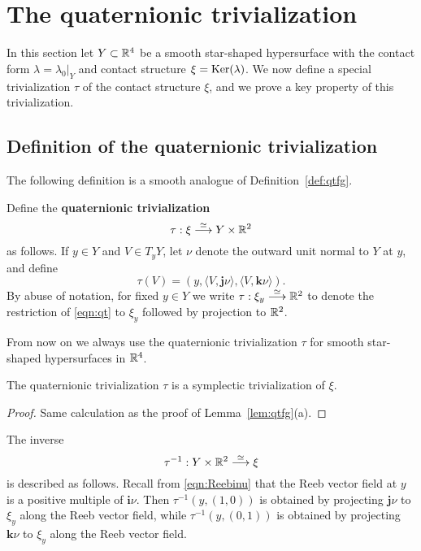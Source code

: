 \section{The quaternionic trivialization}
\label{sec:quaternionic}

In this section let $Y\subset{\mathbb R}^4$ be a smooth star-shaped hypersurface with the contact form $\lambda = \lambda_0|_Y$ and contact structure $\xi=\operatorname{Ker}(\lambda)$. We now define a special trivialization $\tau$ of the contact structure $\xi$, and we prove a key property of this trivialization.

\subsection{Definition of the quaternionic trivialization}

The following definition is a smooth analogue of Definition~\ref{def:qtfg}.

\begin{definition}
Define the {\bf quaternionic trivialization}
\begin{equation}
\label{eqn:qt}
\tau: \xi \stackrel{\simeq}{\longrightarrow} Y\times {\mathbb R}^2
\end{equation}
as follows. If $y\in Y$ and $V\in T_yY$, let $\nu$ denote the outward unit normal to $Y$ at $y$, and define
\[
\tau(V) = \left(y,\langle V,{\mathbf j}\nu\rangle, \langle V,{\mathbf k}\nu\rangle\right).
\]
By abuse of notation, for fixed $y\in Y$ we write $\tau:\xi_y\stackrel{\simeq}{\longrightarrow} {\mathbb R}^2$ to denote the restriction of \eqref{eqn:qt} to $\xi_y$ followed by projection to ${\mathbb R}^2$.
\end{definition}

From now on we always use the quaternionic trivialization $\tau$ for smooth star-shaped hypersurfaces in ${\mathbb R}^4$.

\begin{lemma}
The quaternionic trivialization $\tau$ is a symplectic trivialization of $\xi$.
\end{lemma}

\begin{proof}
Same calculation as the proof of Lemma~\ref{lem:qtfg}(a).
\end{proof}

\begin{remark}
The inverse
\[
\tau^{-1}: Y\times {\mathbb R}^2\stackrel{\simeq}{\longrightarrow} \xi
\]
is described as follows. Recall from \eqref{eqn:Reebinu} that the Reeb vector field at $y$ is a positive multiple of ${\mathbf i}\nu$. Then $\tau^{-1}(y,(1,0))$ is obtained by projecting ${\mathbf j}\nu$ to $\xi_y$ along the Reeb vector field, while $\tau^{-1}(y,(0,1))$ is obtained by projecting ${\mathbf k}\nu$ to $\xi_y$ along the Reeb vector field. 
\end{remark}

